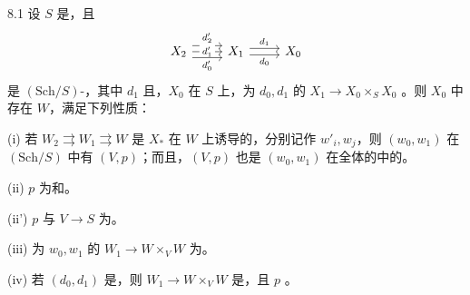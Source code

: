 \begin{SGAresult}{}{8.1}
设 $S$ 是，且
\[
\begin{tikzcd}
X_2\arrow[r,shift left=1.1ex,"d'_2"]\arrow[r,"d'_1" description]\arrow[r,shift right=1.1ex,"d'_0"']&X_1\arrow[r,shift left=.6ex,"d_1"]\arrow[r,shift right=.6ex,"d_0"']&X_0
\end{tikzcd}
\]
是 $(\mathrm{Sch}/S)$-，其中 $d_1$ 且，$X_0$ 在 $S$ 上，为 $d_0,d_1$ 的 $X_1\to X_0\times_SX_0$ 。则 $X_0$ 中存在 $W$，满足下列性质：

(i) 若 $W_2\rightrightarrows W_1\rightrightarrows W$ 是 $X_*$ 在 $W$ 上诱导的，分别记作 $w'_i,w_j$，则 $(w_0,w_1)$ 在 $(\mathrm{Sch}/S)$ 中有 $(V,p)$；而且，$(V,p)$ 也是 $(w_0,w_1)$ 在全体的中的。

(ii) $p$ 为和。

(ii') $p$ 与 $V\to S$ 为。

(iii) 为 $w_0,w_1$ 的 $W_1\to W\times_VW$ 为。

(iv) 若 $(d_0,d_1)$ 是，则 $W_1\to W\times_VW$ 是，且 $p$ 。
\end{SGAresult}

